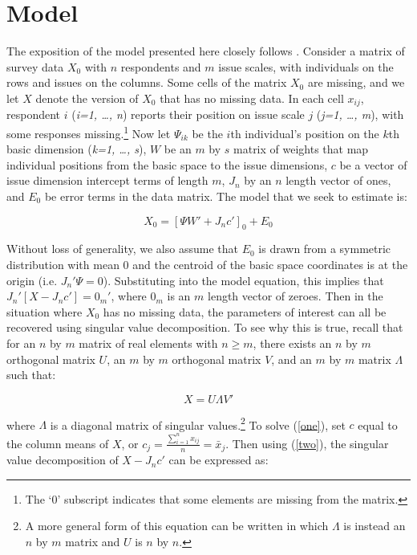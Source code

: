 \documentclass[nojss]{jss}
\begin{document}
\section{Model}

The exposition of the model presented here closely follows \citet{poole1998recovering}. Consider a matrix of survey data $X_0$ with $n$ respondents and $m$ issue scales, with individuals on the rows and issues on the columns. Some cells of the matrix $X_0$ are missing, and we let $X$ denote the version of $X_0$ that has no missing data. In each cell $x_{ij}$, respondent $i$ (\textit{i=1, \ldots, n}) reports their position on issue scale $j$ (\textit{j=1, \ldots, m}), with some responses missing.\footnote{The `0' subscript indicates that some elements are missing from the matrix.} Now let $\Psi_{ik}$ be the $i$th individual's position on the $k$th basic dimension (\textit{k=1, \ldots, s}), $W$ be an $m$ by $s$ matrix of weights that map individual positions from the basic space to the issue dimensions, $c$ be a vector of issue dimension intercept terms of length $m$, $J_n$ by an $n$ length vector of ones, and $E_0$ be error terms in the data matrix. The model that we seek to estimate is:

\begin{equation}
X_0 = [\Psi W' + J_nc']_0 + E_0
\label{one}
\end{equation}

Without loss of generality, we also assume that $E_0$ is drawn from a symmetric distribution with
mean 0 and the centroid of the basic space coordinates is at the origin (i.e. $J_n'\Psi=0$).
Substituting into the model equation, this implies that $J_n'[X-J_nc'] = 0_m'$, where $0_m$ is an $m$
length vector of zeroes. Then in the situation where $X_0$ has no missing data, the parameters
of interest can all be recovered using singular value decomposition.  To see why this is true, recall
that for an $n$ by $m$ matrix of real elements with $n \ge m$, there exists an $n$ by $m$ orthogonal
matrix $U$, an $m$ by $m$ orthogonal matrix $V$, and an $m$ by $m$ matrix $\Lambda$ such that:

\begin{equation}
X = U \Lambda V'
\label{two}
\end{equation}

\noindent where $\Lambda$ is a diagonal matrix of singular values.\footnote{A more general
form of this equation can be written in which $\Lambda$ is instead an $n$ by $m$ matrix and $U$ is
$n$ by $n$.} To solve (\ref{one}), set $c$ equal to the column means of $X$, or $c_j = \frac{\sum\limits_{i=1}^n x_{ij}}{n} = \bar{x}_j$. Then using (\ref{two}), the singular value decomposition of $X - J_nc'$ can be expressed as:
\end{document}
